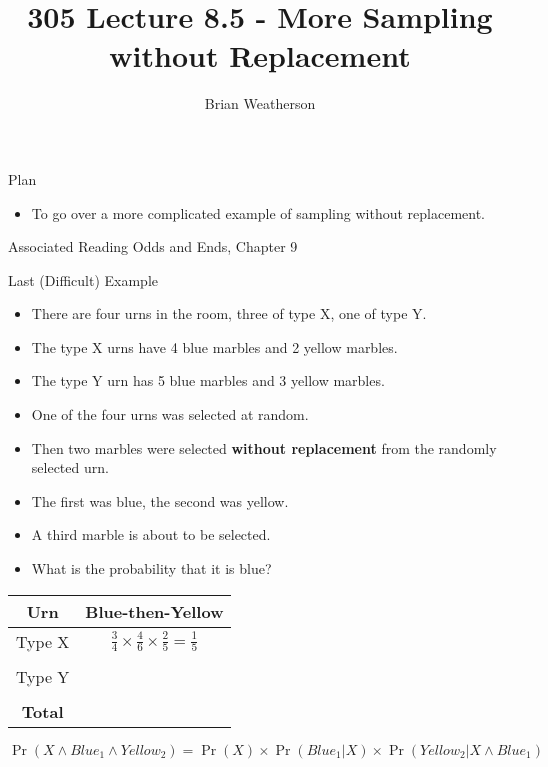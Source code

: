 \documentclass[
  ignorenonframetext,
]{beamer}
\title{305 Lecture 8.5 - More Sampling without Replacement}
\author{Brian Weatherson}
\date{}
\providecommand{\tightlist}{%
  \setlength{\itemsep}{0pt}\setlength{\parskip}{0pt}}
\renewcommand{\,}{\text{, }}
\begin{document}
\frame{\titlepage}

\begin{frame}{Plan}
\protect\hypertarget{plan}{}
\begin{itemize}
\tightlist
\item
  To go over a more complicated example of sampling without replacement.
\end{itemize}
\end{frame}

\begin{frame}{Associated Reading}
\protect\hypertarget{associated-reading}{}
Odds and Ends, Chapter 9
\end{frame}

\begin{frame}{Last (Difficult) Example}
\protect\hypertarget{last-difficult-example}{}
\begin{itemize}
\tightlist
\item
  There are four urns in the room, three of type X, one of type Y.
\item
  The type X urns have 4 blue marbles and 2 yellow marbles.
\item
  The type Y urn has 5 blue marbles and 3 yellow marbles.
\item
  One of the four urns was selected at random.
\item
  Then two marbles were selected \textbf{without replacement} from the
  randomly selected urn.
\item
  The first was blue, the second was yellow.
\item
  A third marble is about to be selected.
\item
  What is the probability that it is blue?
\end{itemize}
\end{frame}

\begin{frame}
\begin{longtable}[]{@{}cc@{}}
\toprule
Urn & Blue-then-Yellow \\
\midrule
\endhead
Type X &
\(\frac{3}{4} \times \frac{4}{6} \times \frac{2}{5} = \frac{1}{5}\) \\
& \\
Type Y & \\
& \\
\textbf{Total} & \\
\bottomrule
\end{longtable}

\[
\Pr(X \wedge Blue_1 \wedge Yellow_2) = \Pr(X) \times \Pr(Blue_1 | X) \times \Pr(Yellow_2 | X \wedge Blue_1)
\]
\end{frame}
\end{document}
